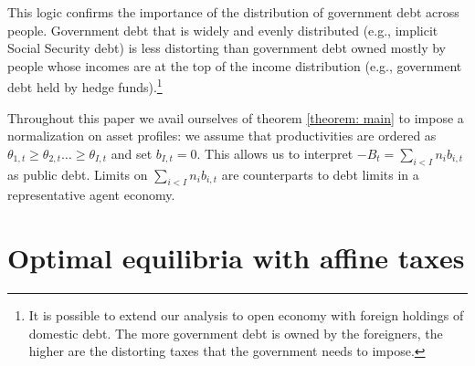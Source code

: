 \documentclass[thmsb,11pt]{article}
\begin{document}
This logic confirms the importance of  the distribution of government debt across people. Government debt that is widely and evenly distributed
(e.g., implicit Social Security debt) is less distorting than
 government debt owned mostly by people whose incomes are at the top of the income
distribution (e.g., government debt held by hedge funds).\footnote{%
It is possible to extend our analysis to open economy with foreign
holdings of domestic debt. The more government debt is owned by the
foreigners, the higher are the distorting taxes that  the government  needs to
impose.}
\color{black}
%

Throughout this paper we avail ourselves of theorem \ref{theorem: main} to impose a normalization on  asset profiles:
we assume that productivities are ordered as  $\theta_{1,t}\geq\theta_{2,t}\ldots\geq \theta_{I,t}$ and set $b_{I,t}=0$. This allows us to interpret $-B_t=\sum_{i<I}n_ib_{i,t}$ as
public debt. Limits on $\sum_{i<I}n_ib_{i,t}$ are counterparts  to  debt limits in a representative agent economy.
%
%

\color{black}

\section{Optimal equilibria with affine taxes}\label{sec: Ramsey Plan}
\end{document}
